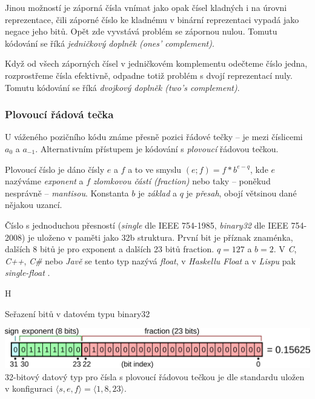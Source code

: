 Jinou možností je záporná čísla vnímat jako opak čísel kladných i na úrovni reprezentace, čili záporné číslo ke kladnému v binární reprezentaci vypadá jako negace jeho bitů. Opět zde vyvstává problém se zápornou nulou. Tomutu kódování se říká \textit{jedničkový doplněk (ones' complement)}.

Když od všech záporných čísel v jedničkovém komplementu odečteme číslo jedna, rozprostřeme čísla efektivně, odpadne totiž problém s dvojí reprezentací nuly. Tomutu kódování se říká \textit{dvojkový doplněk (two's complement)}.

\subsubsection{Plovoucí řádová tečka}
U váženého pozičního kódu známe přesně pozici řádové tečky -- je mezi číslicemi $a_0$ a $a_{-1}$. Alternativním přístupem je kódování s \textit{plovoucí} řádovou tečkou.

Plovoucí číslo je dáno čísly $e$ a $f$ a to ve smyslu $(e;f) = f * b^{e-q}$, kde $e$ nazýváme \textit{exponent} a $f$ \textit{zlomkovou částí (fraction)} nebo taky -- poněkud nesprávně -- \textit{mantisou}. Konstanta $b$ je \textit{základ} a $q$ je \textit{přesah}, obojí větsinou dané nějakou uzancí.

\begin{example}
Číslo s jednoduchou přesností (\textit{single} dle IEEE 754-1985, \textit{binary32} dle IEEE 754-2008) je uloženo v paměti jako 32b struktura. První bit je příznak znaménka, dalších 8 bitů je pro exponent a dalších 23 bitů fraction. $q=127$ a $b=2$. V \textit{C}, \textit{C++}, \textit{C\#} nebo \textit{Javě} se tento typ nazývá \textit{float}, v \textit{Haskellu Float} a v \textit{Lispu} pak \textit{single-float} \cite{wiki:float}.
\begin{myfigure}{H}
\caption{Seřazení bitů v datovém typu binary32 \cite{wiki:file:binary32}}
\includegraphics[width=\linewidth]{graphics/float.png}\label{obr:binary32}
32-bitový datový typ pro čísla s plovoucí řádovou tečkou je dle standardu uložen v konfiguraci $\langle s,e,f \rangle=\langle 1,8,23\rangle$.
\end{myfigure}
\end{example}

